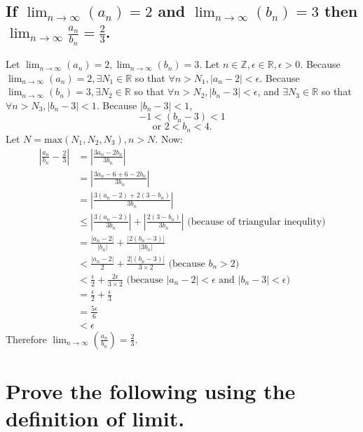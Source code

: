 \documentclass[10pt, letterpaper, titlepage]{article}
\newcommand{\0}{\varnothing}
\newcommand{\Z}{\mathbb{Z}}
\newcommand{\R}{\mathbb{R}}
\newcommand\abs[1]{\left|#1\right|}
\newcommand{\lntinf}{\lim_{n \to \infty}}
\newcommand{\1}{\{ 1 \}}
\newcommand{\2}{\{ (1,1) \}}
\newcommand{\e}{\epsilon}
\newcommand{\an}{a_n}
\newcommand{\bn}{b_n}
\begin{document}
        \subsection{If $\lntinf (a_n) = 2$ and $\lntinf (b_n) = 3$ then $\lntinf \frac{\an}{\bn} = \frac{2}{3}$.}
            Let $\lntinf (\an) = 2, \lntinf (\bn) = 3$. Let $n \in \Z, \e \in \R, \e > 0$.
            Because $\lntinf (\an) = 2, \exists N_1 \in \R$ so that $\forall n > N_1, \abs{\an - 2} < \e$.
            Because $\lntinf (\bn) = 3, \exists N_2 \in \R$ so that $\forall n > N_2, \abs{\bn - 3} < \e$,
            and $\exists N_3 \in \R$ so that $\forall n > N_3, \abs{\bn - 3} < 1$.
            Because $\abs{\bn - 3} < 1$, 
            $$-1 < (\bn - 3) < 1$$
            $$\text{or } 2 < \bn < 4.$$
            Let $N = \text{max}(N_1, N_2, N_3), n > N$.
            Now: 
            \begin{align*}
                \abs{\frac{\an}{\bn} -\frac{2}{3}} &= \abs{\frac{3\an - 2\bn}{3\bn}}\\
                &= \abs{\frac{3\an -6+6- 2\bn}{3\bn}}\\
                &= \abs{\frac{3(\an -2) + 2(3-\bn)}{3\bn}}\\
                &\le \abs{\frac{3(\an - 2)}{3\bn}} + \abs{\frac{2(3-\bn)}{3\bn}} \text{ (because of triangular inequlity)}\\
                &= \frac{\abs{\an - 2}}{\abs{\bn}} + \frac{\abs{2(\bn - 3)}}{\abs{3\bn}}\\
                &< \frac{\abs{\an - 2}}{2} + \frac{2\abs{(\bn - 3)}}{3\times 2} \text{ (because $\bn > 2$)}\\
                &< \frac{\e}{2} + \frac{2\e}{3\times 2} \text{ (because $\abs{\an - 2} < \e$ and $\abs{\bn - 3} < \e$)}\\
                &= \frac{\e}{2} + \frac{\e}{3}\\
                &= \frac{5\e}{6}\\
                &< \e
            \end{align*}
            Therefore $\lntinf (\frac{\an}{\bn}) = \frac{2}{3}$.

    \newpage
    \section{Prove the following using the definition of limit.}
\end{document}
